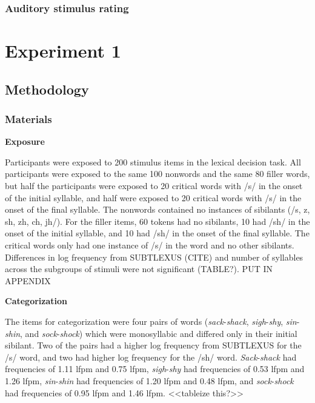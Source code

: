 \subsubsection{Auditory stimulus rating}


\section{Experiment 1}

\subsection{Methodology}

\subsubsection{Materials}

\textbf{Exposure}

Participants were exposed to 200 stimulus items in the lexical decision task.  All participants were exposed to the same 100 nonwords and the same 80 filler words, but half the participants were exposed to 20 critical words with /s/ in the onset of the initial syllable, and half were exposed to 20 critical words with /s/ in the onset of the final syllable.  The nonwords contained no instances of sibilants (/s, z, sh, zh, ch, jh/).  For the filler items, 60 tokens had no sibilants, 10 had /sh/ in the onset of the initial syllable, and 10 had /sh/ in the onset of the final syllable.  The critical words only had one instance of /s/ in the word and no other sibilants.  Differences in log frequency from SUBTLEXUS (CITE) and number of syllables across the subgroups of stimuli were not significant (TABLE?). PUT IN APPENDIX


\textbf{Categorization}

The items for categorization were four pairs of words (\emph{sack}-\emph{shack}, \emph{sigh}-\emph{shy}, \emph{sin}-\emph{shin}, and \emph{sock}-\emph{shock}) which were monosyllabic and differed only in their initial sibilant.  Two of the pairs had a higher log frequency from SUBTLEXUS for the /s/ word, and two had higher log frequency for the /sh/ word.  \emph{Sack}-\emph{shack} had frequencies of 1.11 lfpm and 0.75 lfpm, \emph{sigh}-\emph{shy} had frequencies of 0.53 lfpm and 1.26 lfpm, \emph{sin}-\emph{shin} had frequencies of 1.20 lfpm and 0.48 lfpm, and \emph{sock}-\emph{shock} had frequencies of 0.95 lfpm and 1.46 lfpm. <<tableize this?>>
	

